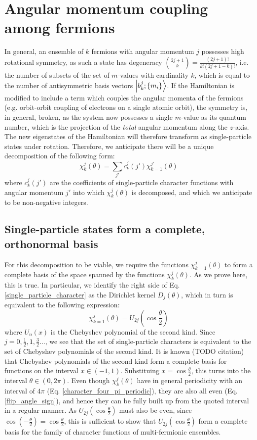 \documentclass[12pt]{article}
\begin{document}
	\section{Angular momentum coupling among fermions}
	In general, an ensemble of $k$ fermions with angular momentum $j$ possesses high rotational symmetry, as such a state has degeneracy $\binom{2j+1}{k}=\frac{(2j+1)!}{k!(2j+1-k)!}$, i.e. the number of subsets of the set of $m$-values with cardinality $k$, which is equal to the number of antisymmetric basis vectors $\ket{b^j_k; \{m_i\}}$. If the Hamiltonian is modified to include a term which couples the angular momenta of the fermions (e.g. orbit\nobreakdash-orbit coupling of electrons on a single atomic orbit), the symmetry is, in general, broken, as the system now possesses a single $m$-value as its quantum number, which is the projection of the \textit{total} angular momentum along the $z$-axis. The new eigenstates of the Hamiltonian will therefore transform as single-particle states under rotation. Therefore, we anticipate there will be a unique decomposition of the following form:
	\begin{equation} \label{general_coupling_decomposition}
	\chi^j_k(\theta)=\sum_{j'}c^j_k(j')\chi^{j'}_{k=1}(\theta)
	\end{equation}
	where $c^j_k(j')$ are the coefficients of single-particle character functions with angular momentum $j'$ into which $\chi^j_k(\theta)$ is decomposed, and which we anticipate to be non-negative integers.
	
	\subsection{Single-particle states form a complete, orthonormal basis}
	For this decomposition to be viable, we require the functions $\chi^j_{k=1}(\theta)$ to form a complete basis of the space spanned by the functions $\chi^j_k(\theta)$. As we prove here, this is true. In particular, we identify the right side of Eq. \ref{single_particle_character} as the Dirichlet kernel $D_j(\theta)$, which in turn is equivalent to the following expression:
	\begin{equation}
	\chi^j_{k=1}(\theta)=U_{2j}\left(\cos{\frac{\theta}{2}}\right)
	\end{equation}
	where $U_{n}(x)$ is the Chebyshev polynomial of the second kind. Since $j=0, \frac{1}{2}, 1, \frac{3}{2}\dots$, we see that the set of single-particle characters is equivalent to the set of Chebyshev polynomials of the second kind. It is known (TODO citation) that Chebyshev polynomials of the second kind form a complete basis for functions on the interval $x\in(-1,1)$. Substituing $x=\cos{\frac{\theta}{2}}$, this turns into the interval $\theta\in (0, 2\pi)$. Even though $\chi^j_k(\theta)$ have in general periodicity with an interval of $4\pi$ (Eq. \ref{character_four_pi_periodic}), they are also all even (Eq. \ref{flip_angle_sign}), and hence they can be fully built up from the quoted interval in a regular manner. As $U_{2j}(\cos{\frac{\theta}{2}})$ must also be even, since $\cos(-\frac{\theta}{2})=\cos{\frac{\theta}{2}}$, this is sufficient to show that $U_{2j}(\cos{\frac{\theta}{2}})$ form a complete basis for the family of character functions of multi-fermionic ensembles.
	
\end{document}
